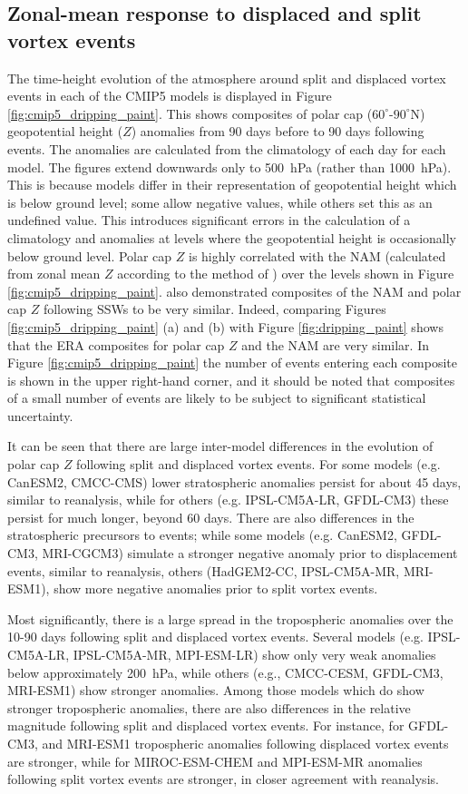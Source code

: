 \subsection{Zonal-mean response to displaced and split vortex events}

The time-height evolution of the atmosphere around split and displaced vortex
events in each of the CMIP5 models is displayed in Figure
\ref{fig:cmip5_dripping_paint}. This shows composites of polar cap
($60^{\circ}$-$90^{\circ}$N) geopotential height ($Z$) anomalies from 90 days
before to 90 days following events. The anomalies are calculated from the
climatology of each day for each model. The figures extend downwards only to
500~hPa (rather than 1000~hPa). This is because models differ in their
representation of geopotential height which is below ground level; some allow
negative values, while others set this as an undefined value. This introduces
significant errors in the calculation of a climatology and anomalies at levels
where the geopotential height is occasionally below ground level. Polar cap $Z$
is highly correlated with the NAM (calculated from zonal mean $Z$ according to
the method of \citet{Baldwin2009}) over the levels shown in Figure
\ref{fig:cmip5_dripping_paint}. \citet{Kushner2010} also demonstrated composites
of the NAM and polar cap $Z$ following SSWs to be very similar. Indeed,
comparing Figures \ref{fig:cmip5_dripping_paint} (a) and (b) with Figure
\ref{fig:dripping_paint} shows that the ERA composites for polar cap $Z$ and the
NAM are very similar. In Figure \ref{fig:cmip5_dripping_paint} the number of
events entering each composite is shown in the upper right-hand corner, and it
should be noted that composites of a small number of events are likely to be
subject to significant statistical uncertainty.

It can be seen that there are large inter-model differences in the evolution of
polar cap $Z$ following split and displaced vortex events. For some models
(e.g. CanESM2, CMCC-CMS) lower stratospheric anomalies persist for about 45
days, similar to reanalysis, while for others (e.g. IPSL-CM5A-LR, GFDL-CM3)
these persist for much longer, beyond 60 days. There are also differences in the
stratospheric precursors to events; while some models (e.g. CanESM2, GFDL-CM3,
MRI-CGCM3) simulate a stronger negative anomaly prior to displacement events,
similar to reanalysis, others (HadGEM2-CC, IPSL-CM5A-MR, MRI-ESM1), show more
negative anomalies prior to split vortex events. 

Most significantly, there is a large spread in the tropospheric anomalies over
the 10-90 days following split and displaced vortex events. Several models
(e.g. IPSL-CM5A-LR, IPSL-CM5A-MR, MPI-ESM-LR) show only very weak anomalies
below approximately 200~hPa, while others (e.g., CMCC-CESM, GFDL-CM3, MRI-ESM1)
show stronger anomalies. Among those models which do show stronger tropospheric
anomalies, there are also differences in the relative magnitude following split
and displaced vortex events. For instance, for GFDL-CM3, and MRI-ESM1
tropospheric anomalies following displaced vortex events are stronger, while for
MIROC-ESM-CHEM and MPI-ESM-MR anomalies following split vortex events are
stronger, in closer agreement with reanalysis. 

